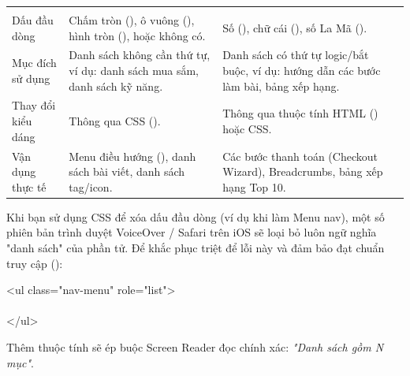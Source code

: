 \begin{prettyTableBox}
\begin{tabularx}{\linewidth}{K{2.8cm} Z Z}
 &  &  \\
Dấu đầu dòng & Chấm tròn (), ô vuông (), hình tròn (), hoặc không có. & Số (), chữ cái (), số La Mã (). \\
Mục đích sử dụng & Danh sách không cần thứ tự, ví dụ: danh sách mua sắm, danh sách kỹ năng. & Danh sách có thứ tự logic/bắt buộc, ví dụ: hướng dẫn các bước làm bài, bảng xếp hạng. \\
Thay đổi kiểu dáng & Thông qua CSS (). & Thông qua thuộc tính HTML  () hoặc CSS. \\
Vận dụng thực tế & Menu điều hướng (), danh sách bài viết, danh sách tag/icon. & Các bước thanh toán (Checkout Wizard), Breadcrumbs, bảng xếp hạng Top 10. \\
\end{tabularx}
\end{prettyTableBox}

\begin{tipBox}
Khi bạn sử dụng CSS  để xóa dấu đầu dòng (ví dụ khi làm Menu nav), một số phiên bản trình duyệt VoiceOver / Safari trên iOS sẽ loại bỏ luôn ngữ nghĩa "danh sách" của phần tử. Để khắc phục triệt để lỗi này và đảm bảo đạt chuẩn truy cập ():

\begin{tcolorbox}[
    enhanced,
    colback=white,
    colframe=tipBorder!35,
    boxrule=0.6pt,
    arc=4pt,
    top=5pt, bottom=5pt, left=10pt, right=10pt,
    before=\par\vspace{4pt}, after=\par\vspace{4pt}
]
{\ttfamily\small\color{codeKey}<ul \color{accentOrange}class\color{darkText}=\color{codeString}"nav-menu" \color{accentOrange}role\color{darkText}=\color{codeString}"list"\color{codeKey}>}\\
\\
{\ttfamily\small\color{codeKey}</ul>}
\end{tcolorbox}

Thêm thuộc tính  sẽ ép buộc Screen Reader đọc chính xác: \textit{"Danh sách gồm N mục"}.
\end{tipBox}

